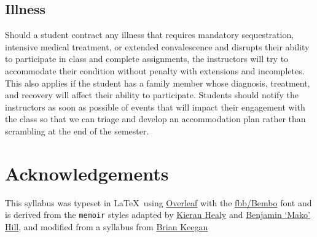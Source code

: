 \documentclass[10pt]{memoir}
\begin{document}
\subsection{Illness}
Should a student contract any illness that requires mandatory sequestration, intensive medical treatment, or extended convalescence and disrupts their ability to participate in class and complete assignments, the instructors will try to accommodate their condition without penalty with extensions and incompletes. This also applies if the student has a family member whose diagnosis, treatment, and recovery will affect their ability to participate. Students should notify the instructors as soon as possible of events that will impact their engagement with the class so that we can triage and develop an accommodation plan rather than scrambling at the end of the semester.

\section{\textbf{Acknowledgements}}

This syllabus was typeset in \LaTeX~using \href{http://www.sharelatex.com}{Overleaf} with the \href{http://www.tug.dk/FontCatalogue/fbb/}{fbb/Bembo} font and is derived from the \texttt{memoir} styles adapted by \href{https://github.com/kjhealy/latex-custom-kjh}{Kieran Healy} and \href{http://projects.mako.cc/source/?p=latex_mako;a=summary}{Benjamin `Mako' Hill}, and modified from a syllabus from \href{https://www.brianckeegan.com/}{Brian Keegan} 



\renewcommand{\bibsection}{\section{\huge \bibname}\prebibhook}
\baselineskip 14.2pt

\end{document}
